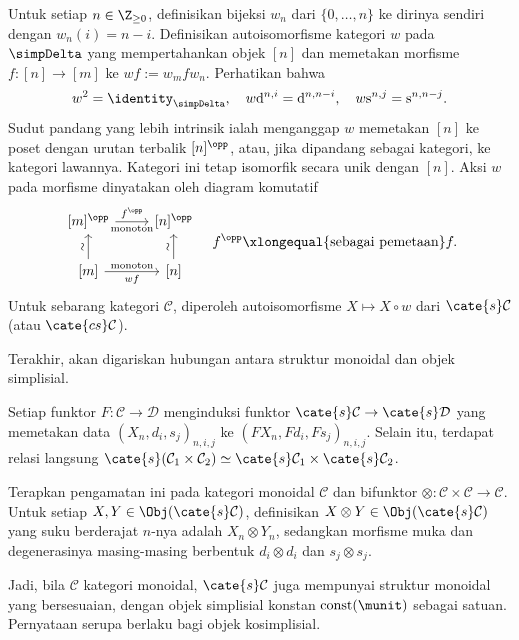\begin{remark}\label{rem:simpDelta-order-reversal}
	Untuk setiap $n\in\Z_{\geq0}$, definisikan bijeksi $w_n$ dari
	$\{0,\ldots,n\}$ ke dirinya sendiri dengan $w_n(i)=n-i$. Definisikan
	autoisomorfisme kategori $w$ pada $\simpDelta$ yang mempertahankan objek
	$[n]$ dan memetakan morfisme $f:[n]\to[m]$ ke
	$wf:=w_mfw_n$. Perhatikan bahwa
	\[ w^2 = \identity_{\simpDelta}, \quad w \mathrm{d}^{n, i} = \mathrm{d}^{n, n-i}, \quad w \mathrm{s}^{n, j} = \mathrm{s}^{n, n-j}. \]
	Sudut pandang yang lebih intrinsik ialah menganggap $w$ memetakan $[n]$
	ke poset dengan urutan terbalik $[n]^{\opp}$, atau, jika dipandang sebagai
	kategori, ke kategori lawannya. Kategori ini tetap isomorfik secara unik
	dengan $[n]$. Aksi $w$ pada morfisme dinyatakan oleh diagram komutatif
	\[\begin{tikzcd}
		{[m]^{\opp}} \arrow[r, "{f^{\opp}}", "\text{monoton}"'] & {[n]^{\opp}} \\
		{[m]} \arrow[r, "\text{monoton}", "{wf}"'] \arrow[u, "\sim" sloped] & {[n]} \arrow[u, "\sim" sloped]
	\end{tikzcd} \quad f^{\opp} \xlongequal{\text{sebagai pemetaan}} f. \]
	Untuk sebarang kategori $\mathcal{C}$, diperoleh autoisomorfisme
	$X\mapsto X\circ w$ dari $\cate{s}\mathcal{C}$ (atau
	$\cate{cs}\mathcal{C}$).
\end{remark}

Terakhir, akan digariskan hubungan antara struktur monoidal dan objek
simplisial.

\begin{definition}\label{def:monoidal-sObj}
	Setiap funktor $F:\mathcal{C}\to\mathcal{D}$ menginduksi funktor
	$\cate{s}\mathcal{C}\to\cate{s}\mathcal{D}$ yang memetakan data
	$(X_n,d_i,s_j)_{n,i,j}$ ke $(FX_n,Fd_i,Fs_j)_{n,i,j}$. Selain itu,
	terdapat relasi langsung
	$\cate{s}(\mathcal{C}_1\times\mathcal{C}_2)\simeq
	\cate{s}\mathcal{C}_1\times\cate{s}\mathcal{C}_2$.

	Terapkan pengamatan ini pada kategori monoidal $\mathcal{C}$ dan bifunktor
	$\otimes:\mathcal{C}\times\mathcal{C}\to\mathcal{C}$. Untuk setiap
	$X,Y\in\Obj(\cate{s}\mathcal{C})$, definisikan
	$X\otimes Y\in\Obj(\cate{s}\mathcal{C})$ yang suku berderajat $n$-nya
	adalah $X_n\otimes Y_n$, sedangkan morfisme muka dan degenerasinya masing-masing
	berbentuk $d_i\otimes d_i$ dan $s_j\otimes s_j$.
\end{definition}

Jadi, bila $\mathcal{C}$ kategori monoidal,
$\cate{s}\mathcal{C}$ juga mempunyai struktur monoidal yang bersesuaian,
dengan objek simplisial konstan $\mathrm{const}(\munit)$ sebagai satuan.
Pernyataan serupa berlaku bagi objek kosimplisial.
